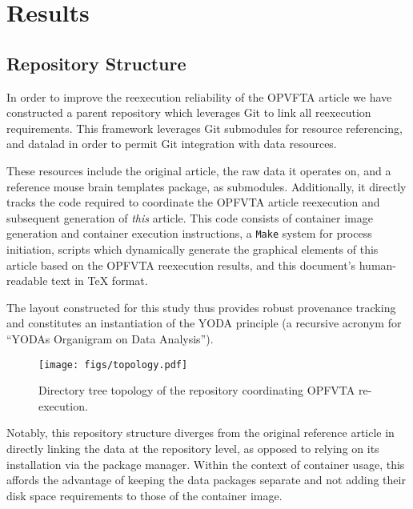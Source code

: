 \section{Results}

\subsection{Repository Structure}
In order to improve the reexecution reliability of the OPVFTA article we have constructed a parent repository which leverages Git to link all reexecution requirements.
This framework leverages Git submodules for resource referencing, and datalad \cite{datalad} in order to permit Git integration with data resources.

These resources include the original article, the raw data it operates on, and a reference mouse brain templates package, as submodules.
Additionally, it directly tracks the code required to coordinate the OPFVTA article reexecution and subsequent generation of \emph{this} article.
This code consists of container image generation and container execution instructions, a \texttt{Make} system for process initiation, scripts which dynamically generate the graphical elements of this article based on the OPFVTA reexecution results, and this document's human-readable text in \TeX{} format.

The layout constructed for this study thus provides robust provenance tracking and constitutes an instantiation of the YODA principle (a recursive acronym for “YODAs Organigram on Data Analysis”).

\begin{figure}
	\centering
	\texttt{[image: figs/topology.pdf]}
	\caption{
		Directory tree topology of the repository coordinating OPFVTA re-execution.
	}
	\label{fig:topology}
\end{figure}

Notably, this repository structure diverges from the original reference article in directly linking the data at the repository level, as opposed to relying on its installation via the package manager.
Within the context of container usage, this affords the advantage of keeping the data packages separate and not adding their disk space requirements to those of the container image.


